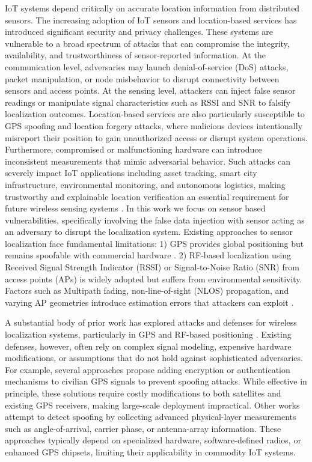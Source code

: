 \documentclass[10pt, twocolumn, letterpaper]{article}
\begin{document}
IoT systems depend critically on accurate location information from distributed sensors. The increasing adoption of IoT sensors and location-based services has introduced significant security and privacy challenges. These systems are vulnerable to a broad spectrum of attacks that can compromise the integrity, availability, and trustworthiness of sensor-reported information. At the communication level, adversaries may launch denial-of-service (DoS) attacks, packet manipulation, or node misbehavior to disrupt connectivity between sensors and access points. At the sensing level, attackers can inject false sensor readings or manipulate signal characteristics such as RSSI and SNR to falsify localization outcomes. Location-based services are also particularly susceptible to GPS spoofing and location forgery attacks, where malicious devices intentionally misreport their position to gain unauthorized access or disrupt system operations. Furthermore, compromised or malfunctioning hardware can introduce inconsistent measurements that mimic adversarial behavior. Such attacks can severely impact IoT applications including asset tracking, smart city infrastructure, environmental monitoring, and autonomous logistics, making trustworthy and explainable location verification an essential requirement for future wireless sensing systems \cite{gpspoofing}. In this work we focus on sensor based vulnerabilities, specifically involving the false data injection with sensor acting as an adversary to disrupt the localization system.  Existing approaches to sensor localization face fundamental limitations: 1) GPS provides global positioning but remains spoofable with commercial hardware \cite{gpsattack}. 2) RF-based localization using Received Signal Strength Indicator (RSSI) or Signal-to-Noise Ratio (SNR) from access points (APs) is widely adopted but suffers from environmental sensitivity. Factors such as Multipath fading, non-line-of-sight (NLOS) propagation, and varying AP geometries introduce estimation errors that attackers can exploit \cite{lorawanattack}. 

A substantial body of prior work has explored attacks and defenses for wireless localization systems, particularly in GPS and RF-based positioning \cite{lorasecurity}. Existing defenses, however, often rely on complex signal modeling, expensive hardware modifications, or assumptions that do not hold against sophisticated adversaries. For example, several approaches propose adding encryption or authentication mechanisms to civilian GPS signals to prevent spoofing attacks. While effective in principle, these solutions require costly modifications to both satellites and existing GPS receivers, making large-scale deployment impractical. Other works attempt to detect spoofing by collecting advanced physical-layer measurements such as angle-of-arrival, carrier phase, or antenna-array information. These approaches typically depend on specialized hardware, software-defined radios, or enhanced GPS chipsets, limiting their applicability in commodity IoT systems.
\end{document}
